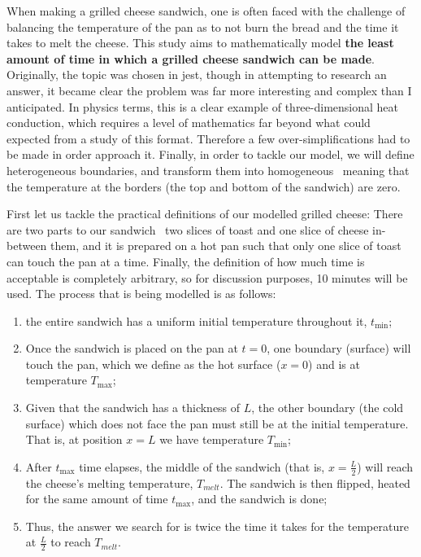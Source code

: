 When making a grilled cheese sandwich, one is often faced with the challenge of balancing the temperature of the pan as to not burn the bread and the time it takes to melt the cheese. 
This study aims to mathematically model \textbf{the least amount of time in which a grilled cheese sandwich can be made}. 
Originally, the topic was chosen in jest, though in attempting to research an answer, it became clear the problem was far more interesting and complex than I anticipated. 
In physics terms, this is a clear example of three-dimensional heat conduction, which requires a level of mathematics far beyond what could expected from a study of this format. 
Therefore a few over-simplifications had to be made in order approach it. 
Finally, in order to tackle our model, we will define heterogeneous boundaries, and transform them into homogeneous \textendash\ meaning that the temperature at the borders (the top and bottom of the sandwich) are zero.

First let us tackle the practical definitions of our modelled grilled cheese: 
There are two parts to our sandwich \textendash\ two slices of toast and one slice of cheese in-between them, and it is prepared on a hot pan such that only one slice of toast can touch the pan at a time. 
Finally, the definition of how much time is acceptable is completely arbitrary, so for discussion purposes, 10 minutes will be used. The process that is being modelled is as follows:

\begin{enumerate}
	\item the entire sandwich has a uniform initial temperature throughout it, $t_{\min}$;
	\item Once the sandwich is placed on the pan at $t = 0$, one boundary (surface) will touch the pan, which we define as the hot surface ($x = 0$) and is at temperature $T_{\max}$;
	\item Given that the sandwich has a thickness of $L$, the other boundary (the cold surface) which does not face the pan must still be at the initial temperature. That is, at position $x = L$ we have temperature $T_{\min}$;
	\item After $t_{\max}$ time elapses, the middle of the sandwich (that is, $x = \frac{L}{2}$) will reach the cheese's melting temperature, $T_{melt}$. The sandwich is then flipped, heated for the same amount of time $t_{\max}$, and the sandwich is done;
	\item Thus, the answer we search for is twice the time it takes for the temperature at $\frac{L}{2}$ to reach $T_{melt}$.
\end{enumerate}

